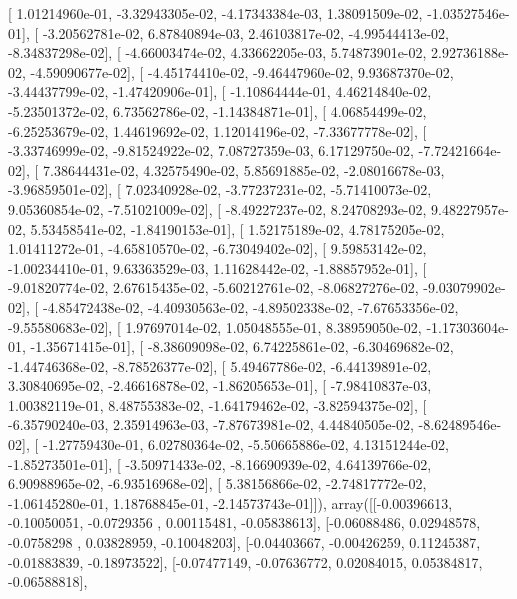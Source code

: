 \documentclass{article}
\begin{document}
       [  1.01214960e-01,  -3.32943305e-02,  -4.17343384e-03,
          1.38091509e-02,  -1.03527546e-01],
       [ -3.20562781e-02,   6.87840894e-03,   2.46103817e-02,
         -4.99544413e-02,  -8.34837298e-02],
       [ -4.66003474e-02,   4.33662205e-03,   5.74873901e-02,
          2.92736188e-02,  -4.59090677e-02],
       [ -4.45174410e-02,  -9.46447960e-02,   9.93687370e-02,
         -3.44437799e-02,  -1.47420906e-01],
       [ -1.10864444e-01,   4.46214840e-02,  -5.23501372e-02,
          6.73562786e-02,  -1.14384871e-01],
       [  4.06854499e-02,  -6.25253679e-02,   1.44619692e-02,
          1.12014196e-02,  -7.33677778e-02],
       [ -3.33746999e-02,  -9.81524922e-02,   7.08727359e-03,
          6.17129750e-02,  -7.72421664e-02],
       [  7.38644431e-02,   4.32575490e-02,   5.85691885e-02,
         -2.08016678e-03,  -3.96859501e-02],
       [  7.02340928e-02,  -3.77237231e-02,  -5.71410073e-02,
          9.05360854e-02,  -7.51021009e-02],
       [ -8.49227237e-02,   8.24708293e-02,   9.48227957e-02,
          5.53458541e-02,  -1.84190153e-01],
       [  1.52175189e-02,   4.78175205e-02,   1.01411272e-01,
         -4.65810570e-02,  -6.73049402e-02],
       [  9.59853142e-02,  -1.00234410e-01,   9.63363529e-03,
          1.11628442e-02,  -1.88857952e-01],
       [ -9.01820774e-02,   2.67615435e-02,  -5.60212761e-02,
         -8.06827276e-02,  -9.03079902e-02],
       [ -4.85472438e-02,  -4.40930563e-02,  -4.89502338e-02,
         -7.67653356e-02,  -9.55580683e-02],
       [  1.97697014e-02,   1.05048555e-01,   8.38959050e-02,
         -1.17303604e-01,  -1.35671415e-01],
       [ -8.38609098e-02,   6.74225861e-02,  -6.30469682e-02,
         -1.44746368e-02,  -8.78526377e-02],
       [  5.49467786e-02,  -6.44139891e-02,   3.30840695e-02,
         -2.46616878e-02,  -1.86205653e-01],
       [ -7.98410837e-03,   1.00382119e-01,   8.48755383e-02,
         -1.64179462e-02,  -3.82594375e-02],
       [ -6.35790240e-03,   2.35914963e-03,  -7.87673981e-02,
          4.44840505e-02,  -8.62489546e-02],
       [ -1.27759430e-01,   6.02780364e-02,  -5.50665886e-02,
          4.13151244e-02,  -1.85273501e-01],
       [ -3.50971433e-02,  -8.16690939e-02,   4.64139766e-02,
          6.90988965e-02,  -6.93516968e-02],
       [  5.38156866e-02,  -2.74817772e-02,  -1.06145280e-01,
          1.18768845e-01,  -2.14573743e-01]]), array([[-0.00396613, -0.10050051, -0.0729356 ,  0.00115481, -0.05838613],
       [-0.06088486,  0.02948578, -0.0758298 ,  0.03828959, -0.10048203],
       [-0.04403667, -0.00426259,  0.11245387, -0.01883839, -0.18973522],
       [-0.07477149, -0.07636772,  0.02084015,  0.05384817, -0.06588818],
\end{document}

